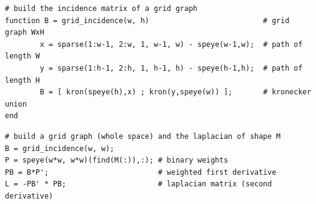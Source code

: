 \documentclass[a4paper,11pt]{article}
\begin{document}
\begin{verbatim}
# build the incidence matrix of a grid graph
function B = grid_incidence(w, h)                          # grid graph WxH
        x = sparse(1:w-1, 2:w, 1, w-1, w) - speye(w-1,w);  # path of length W
        y = sparse(1:h-1, 2:h, 1, h-1, h) - speye(h-1,h);  # path of length H
        B = [ kron(speye(h),x) ; kron(y,speye(w)) ];       # kronecker union
end
\end{verbatim}

\begin{verbatim}
# build a grid graph (whole space) and the laplacian of shape M
B = grid_incidence(w, w);
P = speye(w*w, w*w)(find(M(:)),:); # binary weights
PB = B*P';                         # weighted first derivative
L = -PB' * PB;                     # laplacian matrix (second derivative)
\end{verbatim}
\end{document}
